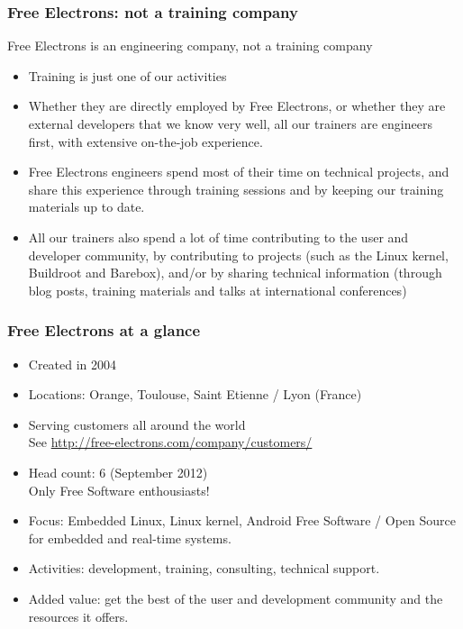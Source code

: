 \begin{frame}
\frametitle{Free Electrons: not a training company}
  Free Electrons is an engineering company, not a training company
  \begin{itemize}
    \item Training is just one of our activities
    \item Whether they are directly employed by Free Electrons, or whether
          they are external developers that we know very well, all 
          our trainers are engineers first, with extensive on-the-job
          experience.
    \item Free Electrons engineers spend most of their time on technical projects,
          and share this experience through training sessions and by
          keeping our training materials up to date.
    \item All our trainers also spend a lot of time contributing to the user
          and developer community, by contributing to projects (such as the Linux kernel,
          Buildroot and Barebox), and/or by sharing technical information (through
          blog posts, training materials and talks at international
          conferences)
  \end{itemize}
\end{frame}

\begin{frame}
\frametitle{Free Electrons at a glance}
  \begin{itemize}
    \item Created in 2004
    \item Locations: Orange, Toulouse, Saint Etienne / Lyon (France)
    \item Serving customers all around the world \\
          See \url{http://free-electrons.com/company/customers/}
    \item Head count: 6 (September 2012) \\
	  Only Free Software enthousiasts!
    \item Focus: Embedded Linux, Linux kernel, Android
          Free Software / Open Source
          for embedded and real-time systems.
    \item Activities: development, training, consulting, technical
          support.
    \item Added value: get the best of the user and development
          community and the resources it offers.
  \end{itemize}
\end{frame}

